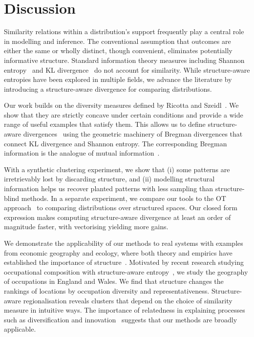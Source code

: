 \documentclass[aps,pre,floats,floatfix,superscriptaddress,twocolumn,final,10pt]{revtex4-2}
\theoremstyle{definition}
\begin{document}
\section{Discussion}

Similarity relations within a distribution’s support frequently play a central role in modelling and inference. The conventional assumption that outcomes are either the same or wholly distinct, though convenient, eliminates potentially informative structure. Standard information theory measures including Shannon entropy~\cite{Shannon1948} and KL divergence~\cite{Kullback1951} do not account for similarity. While structure-aware entropies have been explored in multiple fields, we advance the literature by introducing a structure-aware divergence for comparing distributions.

Our work builds on the diversity measures defined by Ricotta and Szeidl~\cite{Ricotta2006}. We show that they are strictly concave under certain conditions and provide a wide range of useful examples that satisfy them. This allows us to define structure-aware divergences~\cite{Bregman1967} using the geometric machinery of Bregman divergences that connect KL divergence and Shannon entropy. The corresponding Bregman information is the analogue of mutual information~\cite{Banerjee2004}.

With a synthetic clustering experiment, we show that (i) some patterns are irretrievably lost by discarding structure, and (ii) modelling structural information helps us recover planted patterns with less sampling than structure-blind methods. In a separate experiment, we compare our tools to the OT approach~\cite{Villani2009} to comparing distributions over structured spaces. Our closed form expression makes computing structure-aware divergence at least an order of magnitude faster, with vectorising yielding more gains.

We demonstrate the applicability of our methods to real systems with examples from economic geography and ecology, where both theory and empirics have established the importance of structure~\cite{Hidalgo2018, McGill2006}. Motivated by recent research studying occupational composition with structure-aware entropy~\cite{Daniotti2025}, we study the geography of occupations in England and Wales. We find that structure changes the rankings of locations by occupation diversity and representativeness. Structure-aware regionalisation reveals clusters that depend on the choice of similarity measure in intuitive ways. The importance of relatedness in explaining processes such as diversification and innovation~\cite{Neffke2011,Frenken2007, Hidalgo2018} suggests that our methods are broadly applicable.
\end{document}
